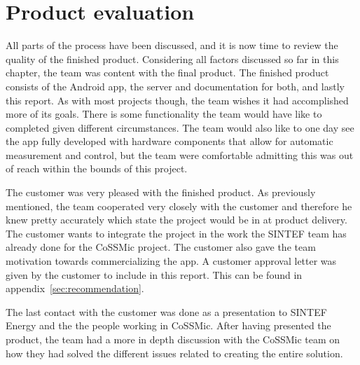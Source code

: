\section{Product evaluation}
All parts of the process have been discussed, and it is now time to review the quality of the finished product. Considering all factors discussed so far in this chapter, the team was content with the final product. The finished product consists of the Android app, the server and documentation for both, and lastly this report. As with most projects though, the team wishes it had accomplished more of its goals. There is some functionality the team would have like to completed given different circumstances. The team would also like to one day see the app fully developed with hardware components that allow for automatic measurement and control, but the team were comfortable admitting this was out of reach within the bounds of this project. 

The customer was very pleased with the finished product. As previously mentioned, the team cooperated very closely with the customer and therefore he knew pretty accurately which state the project would be in at product delivery. The customer wants to integrate the project in the work the SINTEF team has already done for the CoSSMic project. The customer also gave the team motivation towards commercializing the app. A customer approval letter was given by the customer to include in this report. This can be found in appendix~\ref{sec:recommendation}.

The last contact with the customer was done as a presentation to SINTEF Energy and the the people working in CoSSMic. After having presented the product, the team had a more in depth discussion with the CoSSMic team on how they had solved the different issues related to creating the entire solution. 
